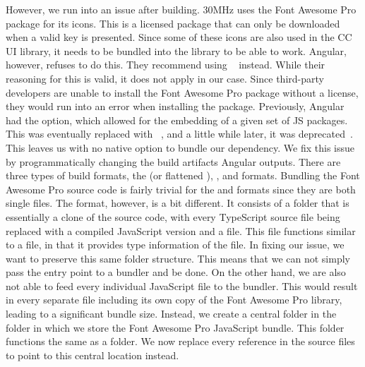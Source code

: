 {  However, we run into an issue after building. 30MHz uses the Font Awesome Pro~ package for its icons. This is a licensed package that can only be downloaded when a valid key is presented. Since some of these icons are also used in the CC UI library, it needs to be bundled into the library to be able to work. Angular, however, refuses to do this. They recommend using ~ instead. While their reasoning for this is valid, it does not apply in our case. Since third-party developers are unable to install the Font Awesome Pro package without a license, they would run into an error when installing the package. Previously, Angular had the  option, which allowed for the embedding of a given set of JS packages. This was eventually replaced with ~, and a little while later, it was deprecated~. This leaves us with no native option to bundle our dependency.
}{
  We fix this issue by programmatically changing the build artifacts Angular outputs. There are three types of build formats, the  (or flattened ), , and  formats. Bundling the Font Awesome Pro source code is fairly trivial for the  and  formats since they are both single files. The  format, however, is a bit different. It consists of a folder that is essentially a clone of the source code, with every TypeScript source file being replaced with a compiled JavaScript version and a  file. This  file functions similar to a  file, in that it provides type information of the file. In fixing our issue, we want to preserve this same folder structure. This means that we can not simply pass the entry point to a bundler and be done. On the other hand, we are also not able to feed every individual JavaScript file to the bundler. This would result in every separate file including its own copy of the Font Awesome Pro library, leading to a significant bundle size. Instead, we create a central folder in the  folder in which we store the Font Awesome Pro JavaScript bundle. This folder functions the same as a  folder. We now replace every reference in the source files to point to this central location instead.
}

